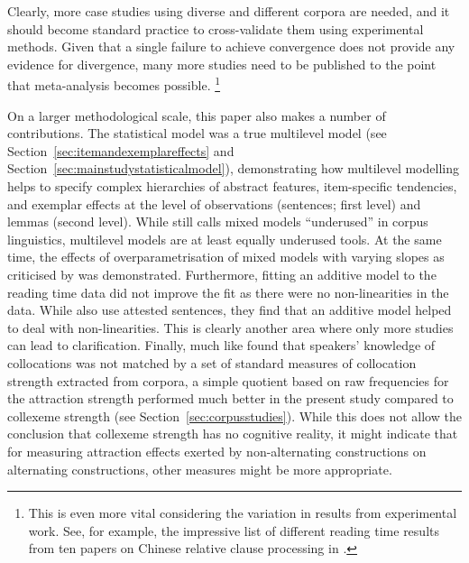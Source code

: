 Clearly, more case studies using diverse and different corpora are needed, and it should become standard practice to cross-validate them using experimental methods.
Given that a single failure to achieve convergence does not provide any evidence for divergence, many more studies need to be published to the point that meta-analysis becomes possible.%
\footnote{This is even more vital considering the variation in results from experimental work.
See, for example, the impressive list of different reading time results from ten papers on Chinese relative clause processing in \citet[8]{Vasishth2015}.}

On a larger methodological scale, this paper also makes a number of contributions.
The statistical model was a true multilevel model (see Section~\ref{sec:itemandexemplareffects} and Section~\ref{sec:mainstudystatisticalmodel}), demonstrating how multilevel modelling helps to specify complex hierarchies of abstract features, item-specific tendencies, and exemplar effects at the level of observations (sentences; first level) and lemmas (second level).
While \cite{Gries2015} still calls mixed models ``underused'' in corpus linguistics, multilevel models are at least equally underused tools.
At the same time, the effects of overparametrisation of mixed models with varying slopes as criticised by \cite{BatesEa2015a} was demonstrated.
Furthermore, fitting an additive model to the reading time data did not improve the fit as there were no non-linearities in the data.
While \cite{DivjakEa2016} also use attested sentences, they find that an additive model helped to deal with non-linearities.
This is clearly another area where only more studies can lead to clarification.
Finally, much like \cite{Dabrowska2014} found that speakers' knowledge of collocations was not matched by a set of standard measures of collocation strength extracted from corpora, a simple quotient based on raw frequencies for the attraction strength performed much better in the present study compared to collexeme strength (see Section~\ref{sec:corpusstudies}).
While this does not allow the conclusion that collexeme strength has no cognitive reality, it might indicate that for measuring attraction effects exerted by non-alternating constructions on alternating constructions, other measures might be more appropriate.

